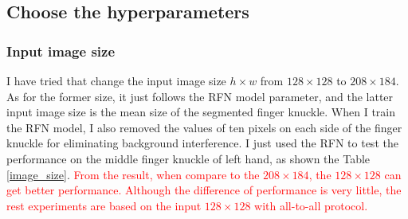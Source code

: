 \subsection{Choose the hyperparameters}
\subsubsection{Input image size}
I have tried that change the input image size $h\times w$ from $128\times128$ to $208\times184$. As for the former size, it just follows the RFN model parameter, and the latter input image size is the mean size of the segmented finger knuckle. When I train the RFN model, I also removed the values of ten pixels on each side of the finger knuckle for eliminating background interference. I just used the RFN to test the performance on the middle finger knuckle of left hand, as shown the Table \ref{image_size}. \textcolor{red}{From the result, when compare to the $208\times184$, the $128\times128$ can get better performance. Although the difference of performance is very little, the rest experiments are based on the input $128\times128$ with all-to-all protocol.}


